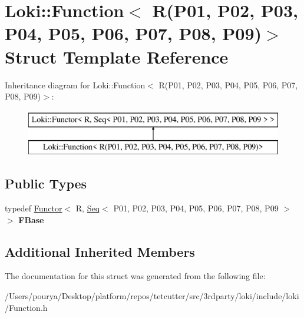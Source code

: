 \hypertarget{structLoki_1_1Function_3_01R_07P01_00_01P02_00_01P03_00_01P04_00_01P05_00_01P06_00_01P07_00_01P08_00_01P09_08_4}{}\section{Loki\+:\+:Function$<$ R(P01, P02, P03, P04, P05, P06, P07, P08, P09)$>$ Struct Template Reference}
\label{structLoki_1_1Function_3_01R_07P01_00_01P02_00_01P03_00_01P04_00_01P05_00_01P06_00_01P07_00_01P08_00_01P09_08_4}
Inheritance diagram for Loki\+:\+:Function$<$ R(P01, P02, P03, P04, P05, P06, P07, P08, P09)$>$\+:\begin{figure}[H]
\begin{center}
\leavevmode
\includegraphics[height=2.000000cm]{structLoki_1_1Function_3_01R_07P01_00_01P02_00_01P03_00_01P04_00_01P05_00_01P06_00_01P07_00_01P08_00_01P09_08_4}
\end{center}
\end{figure}
\subsection*{Public Types}
\begin{DoxyCompactItemize}
\item 
\hypertarget{structLoki_1_1Function_3_01R_07P01_00_01P02_00_01P03_00_01P04_00_01P05_00_01P06_00_01P07_00_01P08_00_01P09_08_4_a69282caee710061494e78f5450ad007f}{}typedef \hyperlink{classLoki_1_1Functor}{Functor}$<$ R, \hyperlink{structLoki_1_1Seq}{Seq}$<$ P01, P02, P03, P04, P05, P06, P07, P08, P09 $>$ $>$ {\bfseries F\+Base}\label{structLoki_1_1Function_3_01R_07P01_00_01P02_00_01P03_00_01P04_00_01P05_00_01P06_00_01P07_00_01P08_00_01P09_08_4_a69282caee710061494e78f5450ad007f}

\end{DoxyCompactItemize}
\subsection*{Additional Inherited Members}


The documentation for this struct was generated from the following file\+:\begin{DoxyCompactItemize}
\item 
/\+Users/pourya/\+Desktop/platform/repos/tetcutter/src/3rdparty/loki/include/loki/Function.\+h\end{DoxyCompactItemize}
